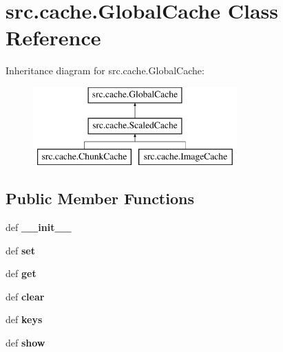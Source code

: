\hypertarget{classsrc_1_1cache_1_1_global_cache}{\section{src.\-cache.\-Global\-Cache \-Class \-Reference}
\label{classsrc_1_1cache_1_1_global_cache}
}
\-Inheritance diagram for src.\-cache.\-Global\-Cache\-:\begin{figure}[H]
\begin{center}
\leavevmode
\includegraphics[height=3.000000cm]{classsrc_1_1cache_1_1_global_cache}
\end{center}
\end{figure}
\subsection*{\-Public \-Member \-Functions}
\begin{DoxyCompactItemize}
\item 
\hypertarget{classsrc_1_1cache_1_1_global_cache_a26b9a187ede599cf55297aab7208f981}{def {\bfseries \-\_\-\-\_\-init\-\_\-\-\_\-}}\label{classsrc_1_1cache_1_1_global_cache_a26b9a187ede599cf55297aab7208f981}

\item 
\hypertarget{classsrc_1_1cache_1_1_global_cache_a91b5d25a33c154754522d190e7e2718a}{def {\bfseries set}}\label{classsrc_1_1cache_1_1_global_cache_a91b5d25a33c154754522d190e7e2718a}

\item 
\hypertarget{classsrc_1_1cache_1_1_global_cache_af24bf67dfcc37a22c6e116ed76d0ee4b}{def {\bfseries get}}\label{classsrc_1_1cache_1_1_global_cache_af24bf67dfcc37a22c6e116ed76d0ee4b}

\item 
\hypertarget{classsrc_1_1cache_1_1_global_cache_a76080238d27ef753f9770c925d73e673}{def {\bfseries clear}}\label{classsrc_1_1cache_1_1_global_cache_a76080238d27ef753f9770c925d73e673}

\item 
\hypertarget{classsrc_1_1cache_1_1_global_cache_a174b418100a2fb9f93af51f7c27d7ac3}{def {\bfseries keys}}\label{classsrc_1_1cache_1_1_global_cache_a174b418100a2fb9f93af51f7c27d7ac3}

\item 
\hypertarget{classsrc_1_1cache_1_1_global_cache_a992de506d9990f2307ccd73600ae5aa1}{def {\bfseries show}}\label{classsrc_1_1cache_1_1_global_cache_a992de506d9990f2307ccd73600ae5aa1}

\end{DoxyCompactItemize}


